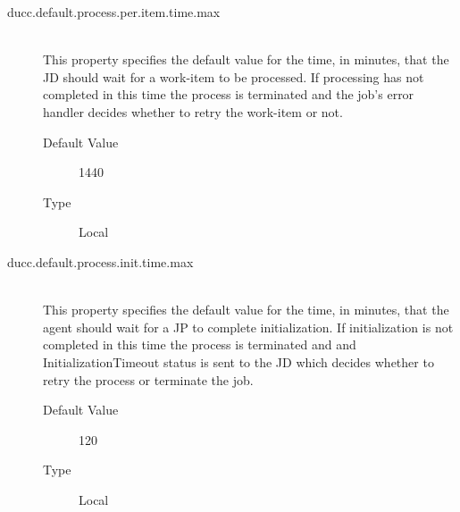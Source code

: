 \begin{description}
        \item[ducc.default.process.per.item.time.max] \hfill \\
          This property specifies the default value for the time, in minutes, that the JD should
          wait for a work-item to be processed. If processing has not completed in this time the 
          process is terminated and the job's error handler decides whether to retry the
          work-item or not.
          \begin{description}
            \item[Default Value] 1440
            \item[Type] Local
          \end{description}

        \item[ducc.default.process.init.time.max] \hfill \\
          This property specifies the default value for the time, in minutes, that the agent should
          wait for a JP to complete initialization. If initialization is not completed in this time
          the process is terminated and and InitializationTimeout status is sent to the JD 
          which decides whether to retry the process or terminate the job. 

          \begin{description}
          \item[Default Value] 120
          \item[Type] Local 
          \end{description}

          
      \end{description}
      
  



